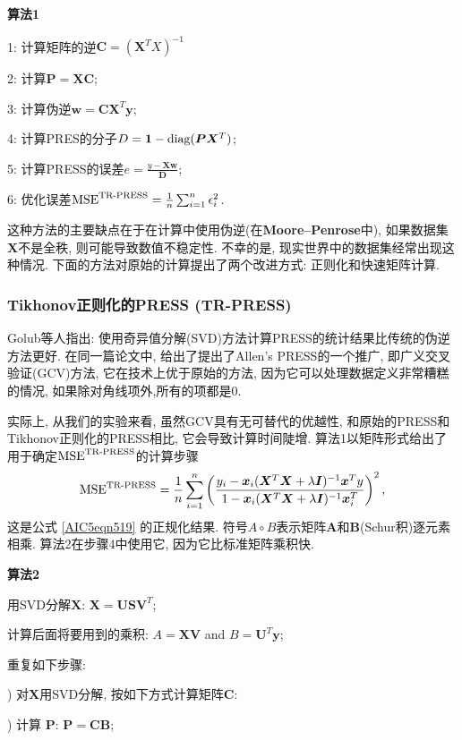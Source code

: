\textbf{算法1}

1: 计算矩阵的逆$\bm C= (\bm X^T X)^{-1}$

2: 计算$\bm P = \bm X\bm C$;

3: 计算伪逆$\bm w = \bm C\bm X^T\bm y$;

4: 计算PRES的分子$D = \bm 1-\textup{diag}(\bm P\bm X^T)$;

5: 计算PRESS的误差$e = \frac{y-\bm X \bm w} {\bm D} $;

6: 优化误差$\textup{MSE}^{\textup{TR-PRESS}}=\frac 1 n \sum_{i=1}^n \epsilon_i^2$.

这种方法的主要缺点在于在计算中使用伪逆(在\textbf{Moore–Penrose}中), 如果数据集$\bm X$不是全秩, 则可能导致数值不稳定性. 不幸的是, 现实世界中的数据集经常出现这种情况. 下面的方法对原始的计算提出了两个改进方式: 正则化和快速矩阵计算.
\subsubsection{Tikhonov正则化的PRESS (TR-PRESS)}
Golub等人\cite{golub1979 generalized}指出: 使用奇异值分解(SVD)方法计算PRESS的统计结果比传统的伪逆方法更好.
在同一篇论文中, 给出了提出了Allen's PRESS的一个推广, 即广义交叉验证(GCV)方法, 它在技术上优于原始的方法, 因为它可以处理数据定义非常糟糕的情况, 如果除对角线项外,所有的项都是0.

实际上, 从我们的实验来看, 虽然GCV具有无可替代的优越性, 和原始的PRESS和Tikhonov正则化的PRESS相比, 它会导致计算时间陡增. 算法1以矩阵形式给出了用于确定$\textup{MSE}^{\textup{TR-PRESS}}$的计算步骤
\begin{align}
    \textup{MSE}^{\textup{TR-PRESS}}=\frac 1 n \sum_{i=1}^n \left( \frac{y_i-\bm x_i(\bm X^T \bm X+\lambda \bm I)^{-1}\bm x^T y  }
       {1-\bm x_i(\bm X^T \bm X+\lambda \bm I)^{-1}\bm x_i^T}\right)^2,
\end{align}
这是公式 \eqref{AIC5eqn519} 的正规化结果. 符号$A\circ B$表示矩阵$\bm A$和$\bm B$(Schur积)逐元素相乘. 算法2在步骤4中使用它, 因为它比标准矩阵乘积快.

\textbf{算法2}

用SVD分解$\bm X$: $\bm X = \bm U\bm S\bm V^T$;

计算后面将要用到的乘积: $A = \bm X\bm V$ and $B = \bm U^T\bm y$;

重复如下步骤:

) 对$\bm X$用SVD分解, 按如下方式计算矩阵$\bm C$:

) 计算 $\bm P$: $\bm P = \bm C\bm B$;

